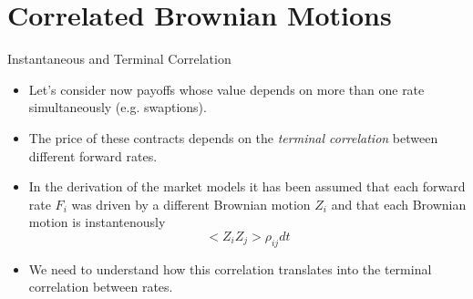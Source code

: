 \documentclass{beamer}
\begin{document}
\section{Correlated Brownian Motions}
\begin{frame}{Instantaneous and Terminal Correlation}
\begin{itemize}
\item Let's consider now payoffs whose value depends on more than one rate simultaneously (e.g. swaptions).
\item The price of these contracts depends on the \emph{terminal correlation} between different forward rates.
\item In the derivation of the market models it has been assumed that each forward rate $F_i$ was driven by a different Brownian motion $Z_i$ and that each Brownian motion is instantenously 
\begin{equation}
< Z_i Z_j> \rho_{ij} dt
\end{equation}
\item We need to understand how this correlation translates into the terminal correlation between rates.
\end{itemize}
\end{frame}
\end{document}
